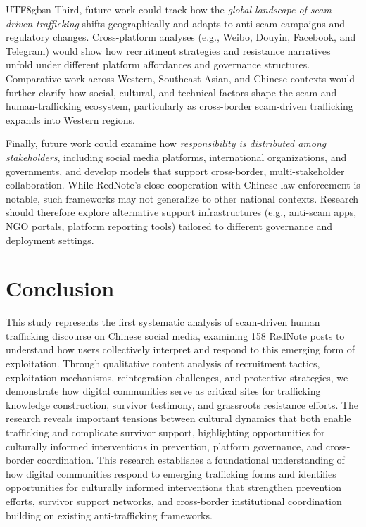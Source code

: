 \documentclass[sigconf,nonacm]{acmart}
\newcommand{\rev}[1]{#1}
\begin{document}
\begin{CJK}{UTF8}{gbsn}
\rev{Third, future work could track how the \textit{global landscape of scam-driven trafficking} shifts geographically and adapts to anti-scam campaigns and regulatory changes. Cross-platform analyses (e.g., Weibo, Douyin, Facebook, and Telegram) would show how recruitment strategies and resistance narratives unfold under different platform affordances and governance structures. Comparative work across Western, Southeast Asian, and Chinese contexts would further clarify how social, cultural, and technical factors shape the scam and human-trafficking ecosystem, particularly as cross-border scam-driven trafficking expands into Western regions.} 

\rev{Finally, future work could examine how \textit{responsibility is distributed among stakeholders}, including social media platforms, international organizations, and governments, and develop models that support cross-border, multi-stakeholder collaboration. While RedNote's close cooperation with Chinese law enforcement is notable, such frameworks may not generalize to other national contexts. Research should therefore explore alternative support infrastructures (e.g., anti-scam apps, NGO portals, platform reporting tools) tailored to different governance and deployment settings.}

\section{Conclusion}

This study represents the first systematic analysis of scam-driven human trafficking discourse on Chinese social media, examining 158 RedNote posts to understand how users collectively interpret and respond to this emerging form of exploitation. Through qualitative content analysis of recruitment tactics, exploitation mechanisms, reintegration challenges, and protective strategies, we demonstrate how digital communities serve as critical sites for trafficking knowledge construction, survivor testimony, and grassroots resistance efforts. The research reveals important tensions between cultural dynamics that both enable trafficking and complicate survivor support, highlighting opportunities for culturally informed interventions in prevention, platform governance, and cross-border coordination. This research establishes a foundational understanding of how digital communities respond to emerging trafficking forms and identifies opportunities for culturally informed interventions that strengthen prevention efforts, survivor support networks, and cross-border institutional coordination building on existing anti-trafficking frameworks.


\end{CJK}
\end{document}
